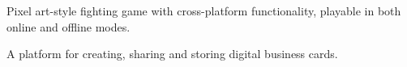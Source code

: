 \documentclass[]{plushcv}
\begin{document}
\begin{minipage}[t]{0.70\textwidth}
\begin{tightemize}
\item Pixel art-style fighting game with cross-platform functionality, playable in both online and offline modes.
\end{tightemize}
\sectionbottomsep

\begin{tightemize}
\item A platform for creating, sharing and storing digital business cards. 
\end{tightemize}
\sectionbottomsep




%
%

\end{minipage} 
\hfill
\end{document}
